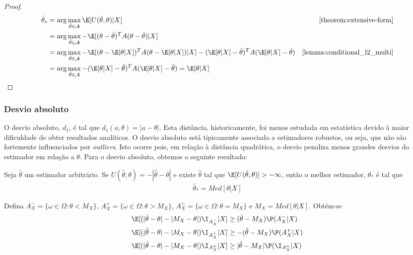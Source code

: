 \begin{proof}
 \begin{align*}
  \hat{\theta}_{*}
  &= \arg\max_{\hat{\theta} \in \mathcal{A}}
  \E[U(\hat{\theta},\theta)|X]
  & \text{\cref{theorem:extensive-form}} \\
  &= \arg\max_{\hat{\theta} \in \mathcal{A}}
  -\E[(\theta-\hat{\theta})^{T}A(\theta-\hat{\theta})|X] \\
  &= \arg\max_{\hat{\theta} \in \mathcal{A}}
  -\E[(\theta-\E[\theta|X])^{T}A(\theta-\E[\theta|X])|X]
  -(\E[\theta|X]-\hat{\theta})^{T}A(\E[\theta|X]-\hat{\theta})	
  & \text{\cref{lemma:conditional_l2_multi}} \\
  &= \arg\max_{\hat{\theta} \in \mathcal{A}}
  -(\E[\theta|X]-\hat{\theta})^{T}A(\E[\theta|X]-\hat{\theta}) 
  = \E[\theta|X]
 \end{align*}
\end{proof}

\subsubsection{Desvio absoluto}

O desvio absoluto, $d_{1}$, é tal que 
$d_{1}(a,\theta) = |a-\theta|$.
Esta distância, historicamente, foi 
menos estudada em estatística devido
à maior dificuldade de obter resultados analíticos.
O desvio absoluto está tipicamente associado a 
estimadores robustos, ou seja, 
que não são fortemente influenciados por \emph{outliers}.
Isto ocorre pois, em relação à distância quadrática,
o desvio penaliza menos grandes desvios do estimador 
em relação a $\theta$.
Para o desvio absoluto, obtemos o seguinte resultado:

\begin{theorem}
 \label{thm:estimation_l1}
 Seja $\hat{\theta}$ um estimador arbitrário.
 Se $U(\hat{\theta},\theta) = -|\hat{\theta}-\theta|$ e
 existe $\hat{\theta}$ tal que 
 $\E[U(\hat{\theta},\theta)] > -\infty$, então 
 o melhor estimador, $\hat{\theta}_{*}$ é tal que
 \begin{align*}
  \hat{\theta}_{*} = Med[\theta|X]
 \end{align*}
\end{theorem}

\begin{lemma}
 \label{lemma:estimation_l1}
 Defina $A^{-}_X = \{\omega \in \Omega: \theta < M_{X}\}$, 
 $A^{+}_X = \{\omega \in \Omega: \theta > M_{X}\}$, 
 $A^{=}_{X} = \{\omega \in \Omega: \theta = M_{X}\}$ e
 $M_X=Med[\theta|X]$. Obtém-se
 \begin{align*}
  \E[(|\hat{\theta}-\theta|-|M_{X}-\theta|)\I_{A^{-}_X}|X]
  &\geq (\hat{\theta}-M_{X})\P(A^{-}_X|X) \\
  \E[(|\hat{\theta}-\theta|-|M_{X}-\theta|)\I_{A^{+}_X}|X]
  &\geq -(\hat{\theta}-M_{X})\P(A^{+}_X|X) \\
  \E[(|\hat{\theta}-\theta|-|M_{X}-\theta|)\I_{A^{=}_X}|X]
  &\geq |\hat{\theta}-M_{X}|\P(\I_{A^{=}_X}|X)
 \end{align*}
\end{lemma}

